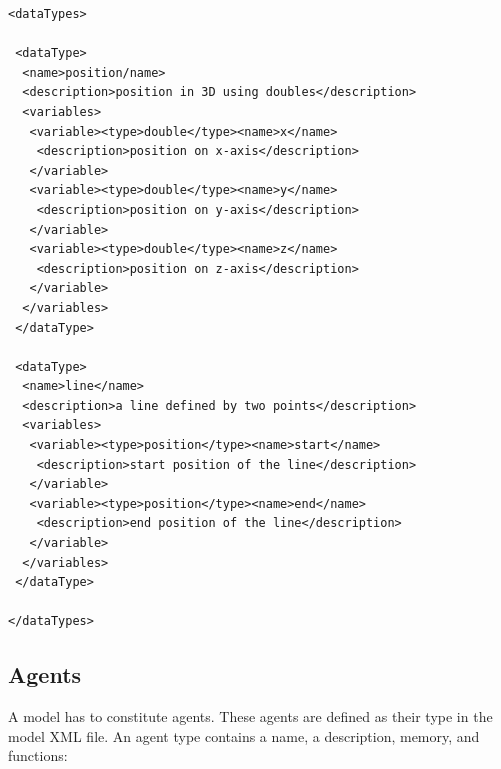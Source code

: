 \documentclass[a4paper,11pt]{article}
\newenvironment{mylisting}
{\begin{list}{}{\setlength{\leftmargin}{1em}}\item\small\bfseries}
{\end{list}}
\begin{document}
\begin{mylisting}
\begin{verbatim}
<dataTypes>

 <dataType>
  <name>position/name>
  <description>position in 3D using doubles</description>
  <variables>
   <variable><type>double</type><name>x</name>
    <description>position on x-axis</description>
   </variable>
   <variable><type>double</type><name>y</name>
    <description>position on y-axis</description>
   </variable>
   <variable><type>double</type><name>z</name>
    <description>position on z-axis</description>
   </variable>
  </variables>
 </dataType>

 <dataType>
  <name>line</name>
  <description>a line defined by two points</description>
  <variables>
   <variable><type>position</type><name>start</name>
    <description>start position of the line</description>
   </variable>
   <variable><type>position</type><name>end</name>
    <description>end position of the line</description>
   </variable>
  </variables>
 </dataType>

</dataTypes>
\end{verbatim}
\end{mylisting}

\subsection{Agents}

A model has to constitute agents. These agents are defined as their
type in the model XML file. An agent type contains a name, a
description, memory, and functions:
\end{document}
